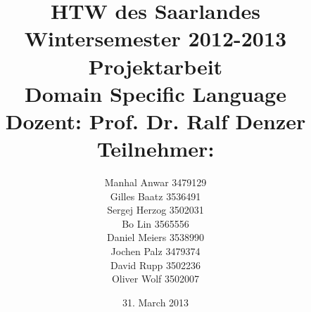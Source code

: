 


\title{%
\large HTW des Saarlandes\\
Wintersemester 2012-2013\\
Projektarbeit\\[10mm]
{\LARGE Domain Specific Language}\\[10mm]
Dozent: Prof. Dr. Ralf Denzer\\[10mm]Teilnehmer:
}

\author{%
Manhal Anwar 3479129\\[2mm]
Gilles Baatz 3536491\\[2mm]
Sergej Herzog 3502031\\[2mm]
Bo Lin 3565556\\[2mm]
Daniel Meiers 3538990\\[2mm]
Jochen Palz 3479374\\[5mm]
David Rupp 3502236\\[2mm]
Oliver Wolf 3502007\\[2mm]
}

\date{31. March 2013}



\maketitle

\tableofcontents
\listoffigures


 










\printbibliography


